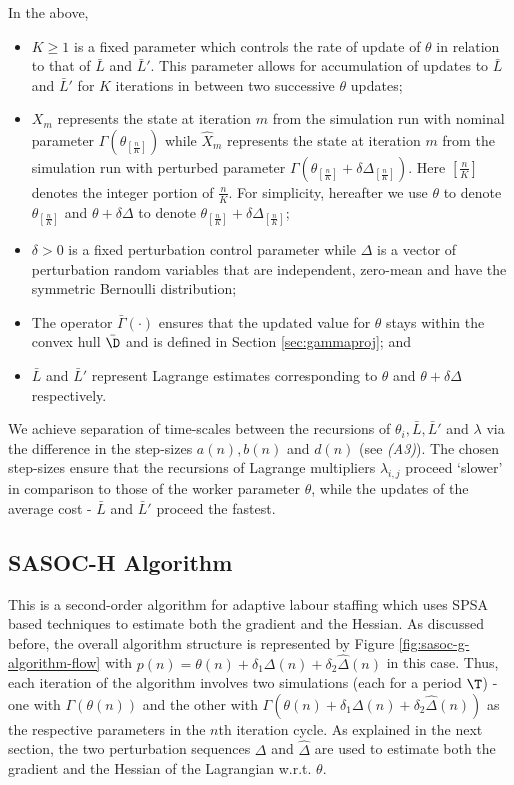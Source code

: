 \documentclass[11pt,letterpaper,english]{article}
\begin{document}
In the above,
\begin{itemize}[$\bullet$]
\item $K \ge 1$ is a fixed parameter which controls the rate of update of $\theta$ in relation to that of $\bar{L}$ and $\bar{L}'$. This parameter allows for accumulation of updates to $\bar{L}$ and $\bar{L}'$ for $K$ iterations in between two successive $\theta$ updates;
\item $X_m$ represents the state at iteration $m$ from the simulation run with nominal parameter $\Gamma(\theta_{[\frac{n}{K}]})$ while $\hat{X}_m$ represents the state at iteration $m$ from the simulation run with perturbed parameter $\Gamma(\theta_{[\frac{n}{K}]} + \delta \Delta_{[\frac{n}{K}]})$. Here $[\frac{n}{K}]$ denotes the integer portion of $\frac{n}{K}$. For simplicity, hereafter we use $\theta$ to denote $\theta_{[\frac{n}{K}]}$ and $\theta + \delta\Delta$ to denote $\theta_{[\frac{n}{K}]} + \delta \Delta_{[\frac{n}{K}]}$;
\item $\delta > 0$ is a fixed perturbation control parameter while $\Delta$ is a vector of perturbation random variables that are independent, zero-mean and have the symmetric Bernoulli distribution;
\item The operator $\bar\Gamma(\cdot)$ ensures that the updated value for $\theta$ stays within the convex hull $\bar\D$ and is defined in Section \ref{sec:gammaproj}; and
\item $\bar{L}$ and $\bar{L}'$ represent Lagrange estimates corresponding to $\theta$ and $\theta + \delta \Delta$ respectively.
\end{itemize}

We achieve separation of time-scales between the recursions of $\theta_{i}, \bar{L}, \bar{L}'$ and $\lambda$ via the difference in the step-sizes $a(n), b(n)$ and $d(n)$ (see \textit{(A3)}).
The chosen step-sizes ensure that the recursions of Lagrange multipliers $\lambda_{i,j}$ proceed `slower' in comparison to those of the worker parameter $\theta$, while the updates of the average cost - $\bar{L}$ and $\bar{L}'$ proceed the fastest.


\subsection{SASOC-H Algorithm}
\label{sec:sasoc-h}
This is  a second-order algorithm for adaptive labour staffing which uses SPSA based techniques to estimate both the gradient and the Hessian. As discussed before, the overall algorithm structure is represented by 
Figure \ref{fig:sasoc-g-algorithm-flow} with $p(n) = \theta(n) + \delta_1 \Delta(n) + \delta_2 \hat \Delta(n)$ in this case. Thus, each iteration of the algorithm involves two simulations (each for a period $\T$) - 
one with $\Gamma(\theta(n))$ and the other with $\Gamma(\theta(n) + \delta_1 \Delta(n) + 
\delta_2 \hat \Delta(n))$ as the respective parameters in the $n$th iteration cycle. As explained in 
the next section, the two perturbation sequences $\Delta$ and $\hat\Delta$ are used to 
estimate both the gradient and the Hessian of the Lagrangian w.r.t. $\theta$.
\end{document}

